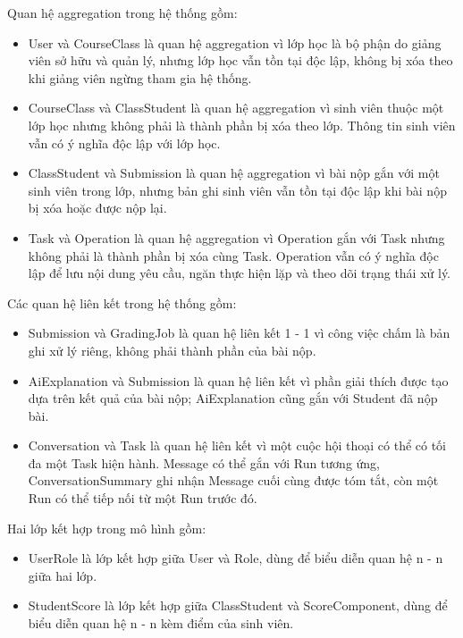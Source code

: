 \documentclass[../BTL.tex]{subfiles}
\begin{document}
Quan hệ aggregation trong hệ thống gồm:

\begin{itemize}[leftmargin=*, nosep]
    \item User và CourseClass là quan hệ aggregation vì lớp học là bộ phận do giảng viên sở hữu và quản lý, nhưng lớp học vẫn tồn tại độc lập, không bị xóa theo khi giảng viên ngừng tham gia hệ thống.
    \item CourseClass và ClassStudent là quan hệ aggregation vì sinh viên thuộc một lớp học nhưng không phải là thành phần bị xóa theo lớp. Thông tin sinh viên vẫn có ý nghĩa độc lập với lớp học.
    \item ClassStudent và Submission là quan hệ aggregation vì bài nộp gắn với một sinh viên trong lớp, nhưng bản ghi sinh viên vẫn tồn tại độc lập khi bài nộp bị xóa hoặc được nộp lại.
    \item Task và Operation là quan hệ aggregation vì Operation gắn với Task nhưng không phải là thành phần bị xóa cùng Task. Operation vẫn có ý nghĩa độc lập để lưu nội dung yêu cầu, ngăn thực hiện lặp và theo dõi trạng thái xử lý.
\end{itemize}

Các quan hệ liên kết trong hệ thống gồm:

\begin{itemize}[leftmargin=*, nosep]
    \item Submission và GradingJob là quan hệ liên kết 1 - 1 vì công việc chấm là bản ghi xử lý riêng, không phải thành phần của bài nộp.
    \item AiExplanation và Submission là quan hệ liên kết vì phần giải thích được tạo dựa trên kết quả của bài nộp; AiExplanation cũng gắn với Student đã nộp bài.
    \item Conversation và Task là quan hệ liên kết vì một cuộc hội thoại có thể có tối đa một Task hiện hành. Message có thể gắn với Run tương ứng, ConversationSummary ghi nhận Message cuối cùng được tóm tắt, còn một Run có thể tiếp nối từ một Run trước đó.
\end{itemize}

Hai lớp kết hợp trong mô hình gồm:

\begin{itemize}[leftmargin=*, nosep]
    \item UserRole là lớp kết hợp giữa User và Role, dùng để biểu diễn quan hệ n - n giữa hai lớp.
    \item StudentScore là lớp kết hợp giữa ClassStudent và ScoreComponent, dùng để biểu diễn quan hệ n - n kèm điểm của sinh viên.
\end{itemize}
\end{document}

